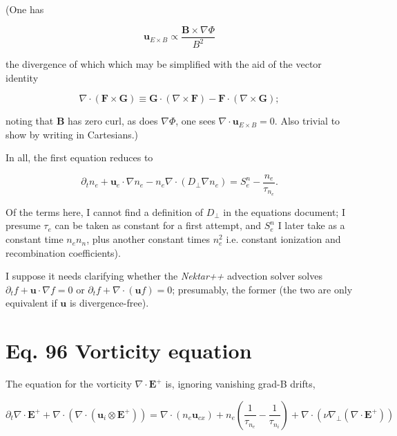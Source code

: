 \documentclass[11pt]{article}
\newcommand{\mbf}{\mathbf}
\begin{document}
(One has

\begin{equation}
\mbf{u}_{E \times B} \propto \frac{\mbf{B} \times \nabla \Phi}{B^2}
\end{equation}

the divergence of which which may be simplified with the aid of the vector identity

\begin{equation}
\nabla \cdot (\mbf{F} \times \mbf{G}) \equiv \mbf{G} \cdot (\nabla \times \mbf{F}) - \mbf{F} \cdot (\nabla \times \mbf{G});
\end{equation}

noting that $\mbf{B}$ has zero curl, as does $\nabla \Phi$, one sees $\nabla \cdot \mbf{u}_{E \times B}=0$.  Also trivial to show by writing in Cartesians.)

In all, the first equation reduces to

\begin{equation}
\partial_t n_e + \mbf{u}_e \cdot \nabla n_e - n_e \nabla \cdot (D_{\perp} \nabla n_e ) = S_e^n - \frac{n_e}{\tau_{n_e}}.
\end{equation}

Of the terms here, I cannot find a definition of $D_{\perp}$ in the equations document; I presume $\tau_e$ can be taken as constant for a first attempt, and $S_e^n$ I later take as a constant time $n_e n_n$, plus another constant times $n_e^2$ i.e. constant ionization and recombination coefficients).


I suppose it needs clarifying whether the {\it Nektar++} advection solver solves $\partial_t f + \mbf{u} \cdot \nabla f = 0$ or $\partial_t f + \nabla \cdot (\mbf{u} f) = 0$; presumably, the former (the two are only equivalent if $\mbf{u}$ is divergence-free).

\section{Eq. 96 Vorticity equation}

The equation for the vorticity $\nabla \cdot \mbf{E}^+$ is, ignoring vanishing grad-B drifts,

\begin{equation}
\partial_t \nabla \cdot \mbf{E}^+ + \nabla \cdot ( \nabla \cdot ( \mbf{u}_i \otimes \mbf{E}^+ )) = \nabla \cdot \left ( n_e \mbf{u}_{cx}\right )+
n_e \left ( \frac{1}{\tau_{n_e}} - \frac{1}{\tau_{n_i}} \right ) + \nabla \cdot (\nu \nabla_{\perp} (\nabla \cdot \mbf{E}^+))
\end{equation}
\end{document}
